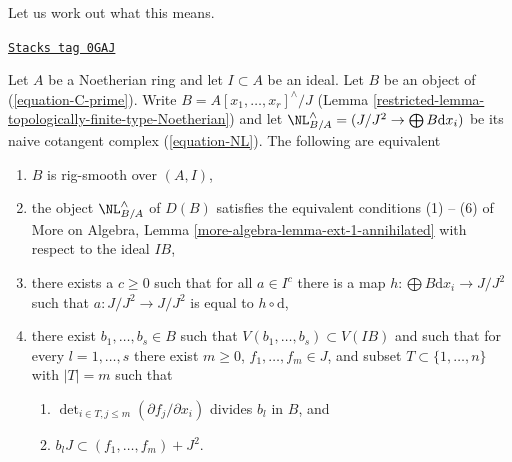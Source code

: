 Let us work out what this means.

\begin{lemma}
\label{restricted-lemma-equivalent-with-artin-smooth}
\href{https://stacks.math.columbia.edu/tag/0GAJ}{\texttt{Stacks tag 0GAJ}}

Let $A$ be a Noetherian ring and let $I \subset A$ be an ideal.
Let $B$ be an object of (\ref{equation-C-prime}). Write
$B = A[x_1, \ldots, x_r]^\wedge/J$
(Lemma \ref{restricted-lemma-topologically-finite-type-Noetherian})
and let $\NL_{B/A}^\wedge = (J/J^2 \to \bigoplus B\text{d}x_i)$
be its naive cotangent complex (\ref{equation-NL}).
The following are equivalent
\begin{enumerate}
\item $B$ is rig-smooth over $(A, I)$,
\item the object $\NL_{B/A}^\wedge$ of $D(B)$ satisfies the equivalent
conditions (1) -- (6) of More on Algebra, Lemma
\ref{more-algebra-lemma-ext-1-annihilated} with respect to the ideal $IB$,
\item there exists a $c \geq 0$ such that for all $a \in I^c$
there is a map $h : \bigoplus B\text{d}x_i \to J/J^2$ such that
$a : J/J^2 \to J/J^2$ is equal to $h \circ \text{d}$,
\item there exist $b_1, \ldots, b_s \in B$ such that
$V(b_1, \ldots, b_s) \subset V(IB)$ and such that for every
$l = 1, \ldots, s$ there exist $m \geq 0$, $f_1, \ldots, f_m \in J$,
and subset $T \subset \{1, \ldots, n\}$ with $|T| = m$ such that
\begin{enumerate}
\item $\det_{i \in T, j \leq m}(\partial f_j/ \partial x_i)$
divides $b_l$ in $B$, and
\item $b_l J \subset (f_1, \ldots, f_m) + J^2$.
\end{enumerate}
\end{enumerate}
\end{lemma}

